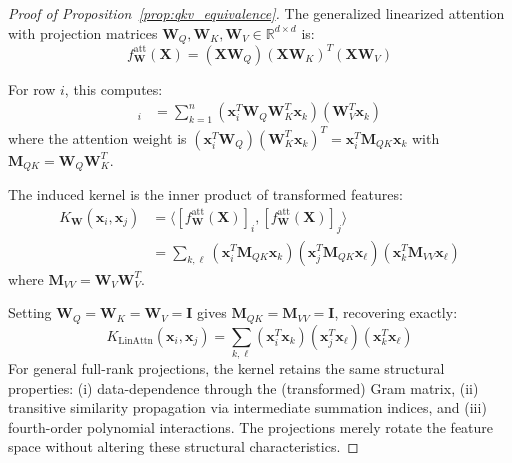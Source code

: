 \documentclass[10pt,a4paper]{amsart}
\newcommand{\R}{\mathbb{R}}
\begin{document}
\begin{proof}[Proof of Proposition~\ref{prop:qkv_equivalence}]
The generalized linearized attention with projection matrices $\mathbf{W}_Q, \mathbf{W}_K, \mathbf{W}_V \in \R^{d \times d}$ is:
\begin{equation}
f^{\text{att}}_{\mathbf{W}}(\mathbf{X}) = (\mathbf{X}\mathbf{W}_Q)(\mathbf{X}\mathbf{W}_K)^T(\mathbf{X}\mathbf{W}_V)
\end{equation}

For row $i$, this computes:
\begin{align}
[f^{\text{att}}_{\mathbf{W}}(\mathbf{X})]_i &= \sum_{k=1}^n (\mathbf{x}_i^T \mathbf{W}_Q \mathbf{W}_K^T \mathbf{x}_k) (\mathbf{W}_V^T \mathbf{x}_k)
\end{align}
where the attention weight is $(\mathbf{x}_i^T \mathbf{W}_Q)(\mathbf{W}_K^T \mathbf{x}_k)^T = \mathbf{x}_i^T \mathbf{M}_{QK} \mathbf{x}_k$ with $\mathbf{M}_{QK} = \mathbf{W}_Q \mathbf{W}_K^T$.

The induced kernel is the inner product of transformed features:
\begin{align}
K_{\mathbf{W}}(\mathbf{x}_i, \mathbf{x}_j) &= \langle [f^{\text{att}}_{\mathbf{W}}(\mathbf{X})]_i, [f^{\text{att}}_{\mathbf{W}}(\mathbf{X})]_j \rangle \nonumber \\
&= \sum_{k,\ell} (\mathbf{x}_i^T \mathbf{M}_{QK} \mathbf{x}_k)(\mathbf{x}_j^T \mathbf{M}_{QK} \mathbf{x}_\ell)(\mathbf{x}_k^T \mathbf{M}_{VV} \mathbf{x}_\ell)
\end{align}
where $\mathbf{M}_{VV} = \mathbf{W}_V \mathbf{W}_V^T$.

Setting $\mathbf{W}_Q = \mathbf{W}_K = \mathbf{W}_V = \mathbf{I}$ gives $\mathbf{M}_{QK} = \mathbf{M}_{VV} = \mathbf{I}$, recovering exactly:
\begin{equation}
K_{\text{LinAttn}}(\mathbf{x}_i, \mathbf{x}_j) = \sum_{k,\ell} (\mathbf{x}_i^T \mathbf{x}_k)(\mathbf{x}_j^T \mathbf{x}_\ell)(\mathbf{x}_k^T \mathbf{x}_\ell)
\end{equation}
For general full-rank projections, the kernel retains the same structural properties: (i) data-dependence through the (transformed) Gram matrix, (ii) transitive similarity propagation via intermediate summation indices, and (iii) fourth-order polynomial interactions. The projections merely rotate the feature space without altering these structural characteristics.
\end{proof}
\end{document}
